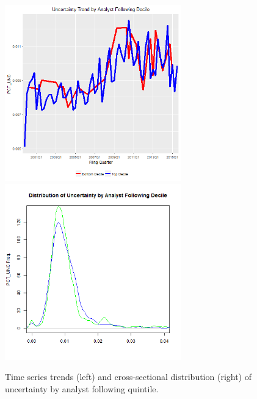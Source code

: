 \begin{figure}[H] 
\centering
\includegraphics[width=3in, height=3in]{figures/punc-by-nanalysts-ts}
\includegraphics[width=3in, height=3in]{figures/punc-by-nanalysts-xs}
\captionsetup{justification=centering, width=.95\textwidth} 
\caption{\footnotesize Time series trends (left) and cross-sectional distribution (right) of uncertainty by analyst following quintile.} \label{bunc-nanalysts}
\end{figure} 
